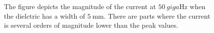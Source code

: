 \documentclass{article}
\begin{document}
\begin{figure}
  \centering
  \noindent{}
  \caption{The figure depicts the magnitude of the current at $\SI{50}{giga\hertz}$ when the dielctric has a width of $\SI{5}{\milli\metre}$. There are parts where the current is several orders of magnitude lower than the peak values.}
  \label{fig:magwall}
\end{figure}
\end{document}
